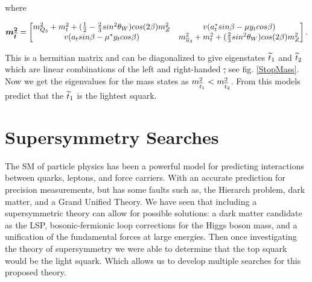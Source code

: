 where 

\begin{equation}
\boldsymbol{m_{\widetilde{t}}^2}=
\begin{bmatrix}
m_{Q_3}^2+m_t^2+(\frac{1}{2}-\frac{2}{3}sin^2\theta_W)cos(2\beta)m_Z^2 & v(a_t^*sin\beta-\mu y_tcos\beta) \\
v(a_tsin\beta-\mu^*y_tcos\beta) & m^2_{\overline{u}_3} +m_t^2+(\frac{2}{3}sin^2\theta_W)cos(2\beta)m^2_Z \\ 
\end{bmatrix}.
\end{equation}

This is a hermitian matrix and can be diagonalized to give eigenstates $\widetilde{t}_1$ and $\widetilde{t}_2$ which are linear combinations of the left and right-handed \st, see fig. \ref{StopMass}. Now we get the eigenvalues for the mass states as $m_{\widetilde{t}_1}^2<m_{\widetilde{t}_2}^2$. From this models predict that the $\widetilde{t}_1$ is the lightest squark. 

\section{Supersymmetry Searches}
The SM of particle physics has been a powerful model for predicting interactions between quarks, leptons, and force carriers. With an accurate prediction for precision measurements, but has some faults such as, the Hierarch problem, dark matter, and a Grand Unified Theory. We have seen that including a supersymmetric theory can allow for possible solutions: a dark matter candidate as the LSP, bosonic-fermionic loop corrections for the Higgs boson mass, and a unification of the fundamental forces at large energies. Then once investigating the theory of supersymmetry we were able to determine that the top squark would be the light squark. Which allows us to develop multiple searches for this proposed theory. 